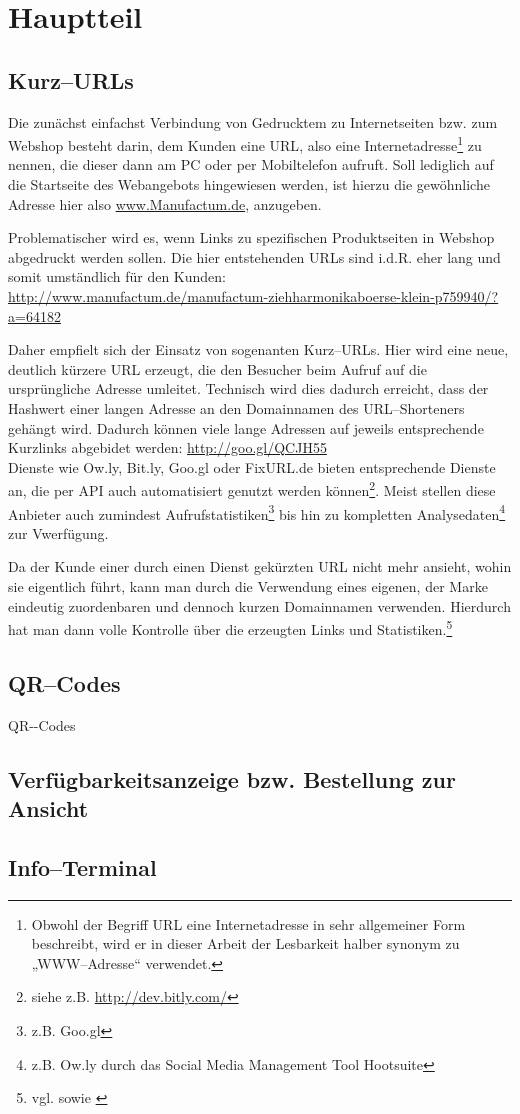 \section{Hauptteil}
\label{sec:hauptteil}

\subsection{Kurz--URLs}

Die zunächst einfachst Verbindung von Gedrucktem zu Internetseiten bzw. zum Webshop besteht darin, dem Kunden eine \ac{URL}, also eine Internetadresse\footnote{Obwohl der Begriff URL eine Internetadresse in sehr allgemeiner Form beschreibt, wird er in dieser Arbeit der Lesbarkeit halber synonym zu „WWW--Adresse“ verwendet.} zu nennen, die dieser dann am PC oder per Mobiltelefon aufruft.
Soll lediglich auf die Startseite des Webangebots hingewiesen werden, ist hierzu die gewöhnliche Adresse hier also \url{www.Manufactum.de}, anzugeben. 

Problematischer wird es, wenn Links zu spezifischen Produktseiten in Webshop abgedruckt werden sollen. Die hier entstehenden \ac{URL}s sind i.d.R. eher lang und somit umständlich für den Kunden:\\ \url{http://www.manufactum.de/manufactum-ziehharmonikaboerse-klein-p759940/?a=64182}

Daher empfielt sich der Einsatz von sogenanten Kurz--URLs. Hier wird eine neue, deutlich kürzere \ac{URL} erzeugt, die den Besucher beim Aufruf auf die ursprüngliche Adresse umleitet. Technisch wird dies dadurch erreicht, dass der Hashwert einer langen Adresse an den Domainnamen des URL--Shorteners gehängt wird. Dadurch können viele lange Adressen auf jeweils
entsprechende Kurzlinks abgebidet werden: \url{http://goo.gl/QCJH55}\\
Dienste wie Ow.ly, Bit.ly, Goo.gl oder FixURL.de bieten entsprechende Dienste an, die per \ac{API} auch automatisiert genutzt werden können\footnote{siehe z.B. \url{http://dev.bitly.com/}}. Meist stellen diese Anbieter auch zumindest Aufrufstatistiken\footnote{z.B. Goo.gl} bis hin zu kompletten Analysedaten\footnote{z.B. Ow.ly durch das Social Media Management Tool Hootsuite} zur Vwerfügung.

Da der Kunde einer durch einen Dienst gekürzten \ac{URL} nicht mehr ansieht, wohin sie eigentlich führt, kann man durch die Verwendung eines eigenen, der Marke eindeutig zuordenbaren und dennoch kurzen Domainnamen verwenden. Hierdurch hat man dann volle Kontrolle über die erzeugten Links und Statistiken.\footnote{vgl. \cite{webmag} sowie \cite{gillen}}

\subsection{QR--Codes}

\ac{QR--Codes} 

\subsection{Verfügbarkeitsanzeige bzw. Bestellung zur Ansicht}
\subsection{Info--Terminal}

